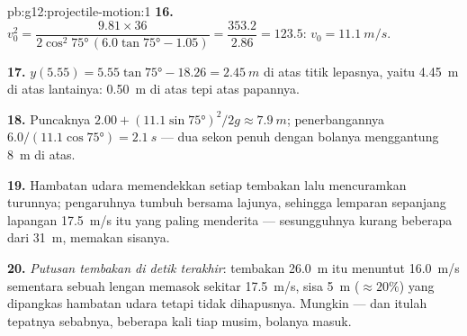 \begin{solution}{pb:g12:projectile-motion:1}
\textbf{16.} $v_0^2 = \dfrac{9.81 \times 36}{2\cos^2\ang{75}\,
(6.0\tan\ang{75} - 1.05)} = \dfrac{353.2}{2.86} = 123.5$:
$v_0 = \qty{11.1}{m/s}$.

\textbf{17.} $y(5.55) = 5.55\tan\ang{75} - 18.26 = \qty{2.45}{m}$
di atas titik lepasnya, yaitu \qty{4.45}{m} di atas lantainya: \qty{0.50}{m}
di atas tepi atas papannya.

\textbf{18.} Puncaknya $2.00 + (11.1\sin\ang{75})^2/2g \approx
\qty{7.9}{m}$; penerbangannya $6.0/(11.1\cos\ang{75}) = \qty{2.1}{s}$ ---
dua sekon penuh dengan bolanya menggantung \qty{8}{m} di atas.

\textbf{19.} Hambatan udara memendekkan setiap tembakan lalu mencuramkan
turunnya; pengaruhnya tumbuh bersama lajunya, sehingga lemparan sepanjang
lapangan \qty{17.5}{m/s} itu yang paling menderita --- 
sesungguhnya kurang beberapa  dari \qty{31}{m}, memakan sisanya.

\textbf{20.} \emph{Putusan tembakan di detik terakhir}: tembakan
\qty{26.0}{m} itu menuntut \qty{16.0}{m/s} sementara sebuah lengan memasok
sekitar \qty{17.5}{m/s}, sisa  \qty{5}{m} ($\approx 20\%$) yang
dipangkas hambatan udara tetapi tidak dihapusnya. Mungkin --- dan itulah
tepatnya sebabnya, beberapa kali tiap musim, bolanya masuk.
\end{solution}
